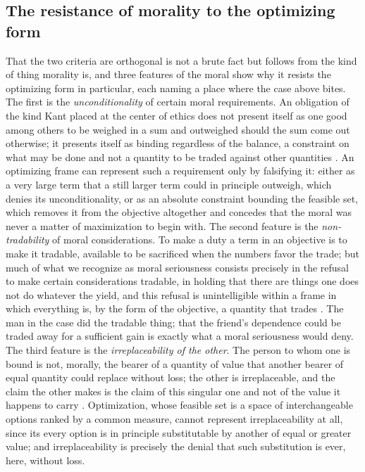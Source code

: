 \subsection*{The resistance of morality to the optimizing form}

That the two criteria are orthogonal is not a brute fact but follows from the kind of thing morality is, and three features of the moral show why it resists the optimizing form in particular, each naming a place where the case above bites. The first is the \emph{unconditionality} of certain moral requirements. An obligation of the kind Kant placed at the center of ethics does not present itself as one good among others to be weighed in a sum and outweighed should the sum come out otherwise; it presents itself as binding regardless of the balance, a constraint on what may be done and not a quantity to be traded against other quantities \parencite{kant1998groundwork}. An optimizing frame can represent such a requirement only by falsifying it: either as a very large term that a still larger term could in principle outweigh, which denies its unconditionality, or as an absolute constraint bounding the feasible set, which removes it from the objective altogether and concedes that the moral was never a matter of maximization to begin with. The second feature is the \emph{non-tradability} of moral considerations. To make a duty a term in an objective is to make it tradable, available to be sacrificed when the numbers favor the trade; but much of what we recognize as moral seriousness consists precisely in the refusal to make certain considerations tradable, in holding that there are things one does not do whatever the yield, and this refusal is unintelligible within a frame in which everything is, by the form of the objective, a quantity that trades \parencite{williams1985limits}. The man in the case did the tradable thing; that the friend's dependence could be traded away for a sufficient gain is exactly what a moral seriousness would deny. The third feature is the \emph{irreplaceability of the other}. The person to whom one is bound is not, morally, the bearer of a quantity of value that another bearer of equal quantity could replace without loss; the other is irreplaceable, and the claim the other makes is the claim of this singular one and not of the value it happens to carry \parencite{levinas1969totality}. Optimization, whose feasible set is a space of interchangeable options ranked by a common measure, cannot represent irreplaceability at all, since its every option is in principle substitutable by another of equal or greater value; and irreplaceability is precisely the denial that such substitution is ever, here, without loss.

